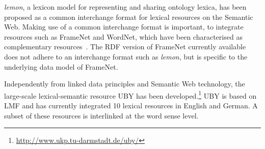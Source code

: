 
\emph{lemon}, a lexicon model for representing and sharing ontology lexica, 
has been proposed as a common interchange format for lexical resources on the Semantic Web\cite{mccrae2012interchanging}. 
Making use of a common interchange format
is important, to integrate resources such as FrameNet and WordNet, which have
been characterised as
complementary resources~\cite{baker2009wordnet}. The RDF version of FrameNet currently available does not adhere to an interchange format such as \emph{lemon}, but is specific to the underlying data model of FrameNet.


Independently from linked data principles and Semantic Web technology, the large-scale lexical-semantic resource UBY \cite{gurevych2012uby} has been developed.\footnote{\url{http://www.ukp.tu-darmstadt.de/uby/}}
UBY is based on LMF and has currently integrated 10 lexical resources
 in English and German. A subset of these resources
is interlinked at the word sense level. 

